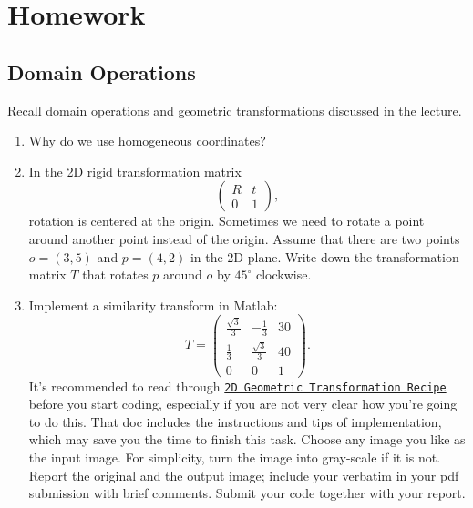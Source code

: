 \section{Homework \thesection}

\subsection{Domain Operations}
Recall domain operations and geometric transformations discussed in the lecture.
\begin{enumerate}
\item Why do we use homogeneous coordinates?
\item In the 2D rigid transformation matrix
		\[ \begin{pmatrix}
		R & t \\ 0 & 1
		\end{pmatrix}, \]
		rotation is centered at the origin.
		Sometimes we need to rotate a point around another point instead of the origin.
		Assume that	there are two points \(o=(3,5)\) and \(p=(4,2)\) in the 2D plane.
		Write down the transformation matrix \(T\) that rotates \(p\) around \(o\) by \(45^\circ\) clockwise.
\item Implement a similarity transform in Matlab:
		\[T=\begin{pmatrix}
		\frac{\sqrt{3}}{3} & -\frac{1}{3} & 30 \\
		\frac{1}{3} & \frac{\sqrt{3}}{3} & 40 \\
		0 & 0 & 1
		\end{pmatrix}.
		\]
		It's recommended to read through \href{./hw2/2DGeometrixTransformationRecipe.pdf}{\texttt{2D Geometric Transformation Recipe}} before you start coding, especially if you are not very clear how you're going to do this.
		That doc includes the instructions and tips of implementation, which may save you the time to finish this task.
		Choose any image you like as the input image.
		For simplicity, turn the image into gray-scale if it is not.
		Report the original and the output image; include your verbatim in your pdf submission with brief comments.
		Submit your code together with your report.
\end{enumerate}

